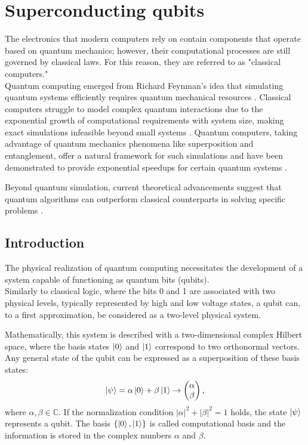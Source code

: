 \chapter{Superconducting qubits}

The electronics that modern computers rely on contain components that operate based on quantum mechanics; however, their computational processes are still governed by classical laws. 
For this reason, they are referred to as "classical computers."\\

Quantum computing emerged from Richard Feynman’s idea that simulating quantum systems efficiently requires quantum mechanical resources \cite{Feynman1982}. 
Classical computers struggle to model complex quantum interactions due to the exponential growth of computational requirements with system size, making exact simulations infeasible beyond small systems \cite{Brown2010}. 
Quantum computers, taking advantage of quantum mechanics phenomena like superposition and entanglement, offer a natural framework for such simulations and have been demonstrated to provide exponential speedups for certain quantum systems \cite{Georgescu_2014}.

Beyond quantum simulation, current theoretical advancements suggest that quantum algorithms can outperform classical counterparts in solving specific problems \cite{Montanaro2016}.

\section{Introduction}
The physical realization of quantum computing necessitates the development of a system capable of functioning as quantum bits (qubits).\\
Similarly to classical logic, where the bits 0 and 1 are associated with two physical levels, typically represented by high and low voltage states, a qubit can, to a first approximation, be considered as a two-level physical system.

Mathematically, this system is described with a two-dimensional complex Hilbert space, where the basis states $\ket{0}$ and $\ket{1}$ correspond to two orthonormal vectors.
Any general state of the qubit can be expressed as a superposition of these basis states:
\begin{equation}\label{eq:qubit}
    \ket{\psi} = \alpha\ket{0} + \beta\ket{1} \rightarrow \begin{pmatrix} 
        \alpha \\ 
        \beta 
        \end{pmatrix},
\end{equation}
where $\alpha,\beta\in \mathbb{C}$. If the normalization condition $|\alpha|^2 +|\beta|^2 =1$ holds, the state $\ket{\psi}$ represents a qubit.
The basis $\{\ket{0},\ket{1}\}$ is called computational basis and the information is stored in the complex numbers $\alpha$ and $\beta$.


